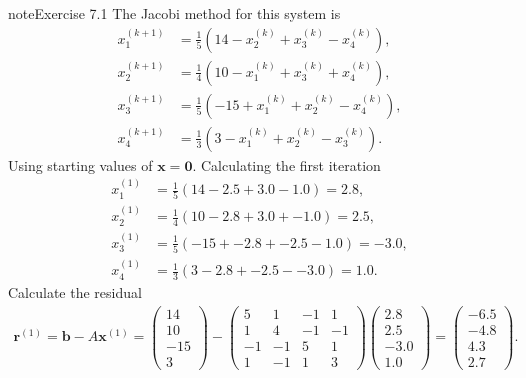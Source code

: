 \documentclass[letterpaper,10pt,english]{jupyterBook}
\begin{document}
\begin{sphinxadmonition}{note}{Exercise 7.1}
\sphinxAtStartPar
The Jacobi method for this system is
\begin{align*}
    x_{1}^{(k+1)} &= \frac{1}{5} \left( 14 - x_{2}^{(k)} + x_{3}^{(k)} - x_{4}^{(k)} \right), \\
    x_{2}^{(k+1)} &= \frac{1}{4} \left( 10 - x_{1}^{(k)} + x_{3}^{(k)} + x_{4}^{(k)} \right), \\
    x_{3}^{(k+1)} &= \frac{1}{5} \left( -15 + x_{1}^{(k)} + x_{2}^{(k)} - x_{4}^{(k)} \right), \\
    x_{4}^{(k+1)} &= \frac{1}{3} \left( 3 - x_{1}^{(k)} + x_{2}^{(k)} - x_{3}^{(k)} \right).
\end{align*}
\sphinxAtStartPar
Using starting values of \(\mathbf{x} = \mathbf{0}\). Calculating the first iteration
\begin{align*}
    x_{1}^{(1)} &= \frac{1}{5} \left( 14 - 2.5 + 3.0 - 1.0 \right) = 2.8, \\
    x_{2}^{(1)} &= \frac{1}{4} \left( 10 - 2.8 + 3.0 + -1.0 \right) = 2.5, \\
    x_{3}^{(1)} &= \frac{1}{5} \left( -15 + -2.8 + -2.5 - 1.0 \right) = -3.0, \\
    x_{4}^{(1)} &= \frac{1}{3} \left( 3 - 2.8 + -2.5 - -3.0 \right) = 1.0.
\end{align*}
\sphinxAtStartPar
Calculate the residual
\begin{align*}
    \mathbf{r}^{(1)} = \mathbf{b} - A \mathbf{x}^{(1)} = 
    \begin{pmatrix} 14 \\ 10 \\ -15 \\ 3 \end{pmatrix} -
    \begin{pmatrix} 5 & 1 & -1 & 1 \\ 1 & 4 & -1 & -1 \\ -1 & -1 & 5 & 1 \\ 1 & -1 & 1 & 3 \end{pmatrix}
    \begin{pmatrix} 2.8 \\ 2.5 \\ -3.0 \\ 1.0 \end{pmatrix} =
    \begin{pmatrix} -6.5 \\ -4.8 \\ 4.3 \\ 2.7 \end{pmatrix}.
\end{align*}

\end{sphinxadmonition}
\end{document}
